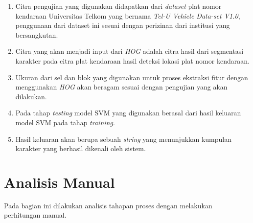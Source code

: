 \begin{enumerate}
	\item Citra pengujian yang digunakan didapatkan dari \textit{dataset} plat nomor kendaraan Universitas Telkom yang bernama \textit{Tel-U Vehicle Data-set V1.0}, penggunaan dari dataset ini sesuai dengan perizinan dari institusi yang bersangkutan.
	\item Citra yang akan menjadi input dari \textit{HOG} adalah citra hasil dari segmentasi karakter pada citra plat kendaraan hasil deteksi lokasi plat nomor kendaraan.
	\item Ukuran dari sel dan blok yang digunakan untuk proses ekstraksi fitur dengan menggunakan \textit{HOG} akan beragam sesuai dengan pengujian yang akan dilakukan.
	\item Pada tahap \textit{testing} model SVM yang digunakan berasal dari hasil keluaran model SVM pada tahap \textit{training}.
	\item Hasil keluaran akan berupa sebuah \textit{string} yang menunjukkan kumpulan karakter yang berhasil dikenali oleh sistem.\\
\end{enumerate}

\section{Analisis Manual}
\noindent Pada bagian ini dilakukan analisis tahapan proses dengan melakukan perhitungan manual.\\

